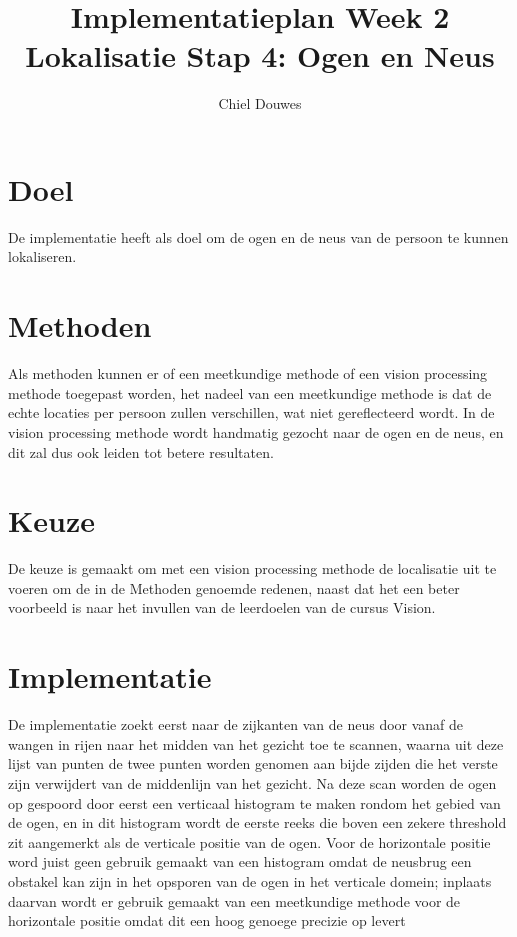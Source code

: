 \documentclass[11pt]{article}
\title{Implementatieplan Week 2 Lokalisatie Stap 4: Ogen en Neus}
\author{Chiel Douwes}
\begin{document}
    \maketitle


    \section{Doel}\label{sec:doel}
    De implementatie heeft als doel om de ogen en de neus van de persoon te kunnen lokaliseren.


    \section{Methoden}\label{sec:methoden}
    Als methoden kunnen er of een meetkundige methode of een vision processing methode toegepast
    worden, het nadeel van een meetkundige methode is dat de echte locaties per persoon zullen
    verschillen, wat niet gereflecteerd wordt.
    In de vision processing methode wordt handmatig gezocht naar de ogen en de neus, en dit zal
    dus ook leiden tot betere resultaten.


    \section{Keuze}\label{sec:keuze}
    De keuze is gemaakt om met een vision processing methode de localisatie uit te voeren om de
    in de Methoden genoemde redenen, naast dat het een beter voorbeeld is naar het invullen van
    de leerdoelen van de cursus Vision.


    \section{Implementatie}\label{sec:implementatie}
    De implementatie zoekt eerst naar de zijkanten van de neus door vanaf de wangen in rijen naar
    het midden van het gezicht toe te scannen, waarna uit deze lijst van punten de twee punten
    worden genomen aan bijde zijden die het verste zijn verwijdert van de middenlijn van het
    gezicht.
    Na deze scan worden de ogen op gespoord door eerst een verticaal histogram te maken rondom het
    gebied van de ogen, en in dit histogram wordt de eerste reeks die boven een zekere threshold
    zit aangemerkt als de verticale positie van de ogen.
    Voor de horizontale positie word juist geen gebruik gemaakt van een histogram omdat de
    neusbrug een obstakel kan zijn in het opsporen van de ogen in het verticale domein;
    inplaats daarvan wordt er gebruik gemaakt van een meetkundige methode voor de horizontale
    positie omdat dit een hoog genoege precizie op levert
\end{document}
